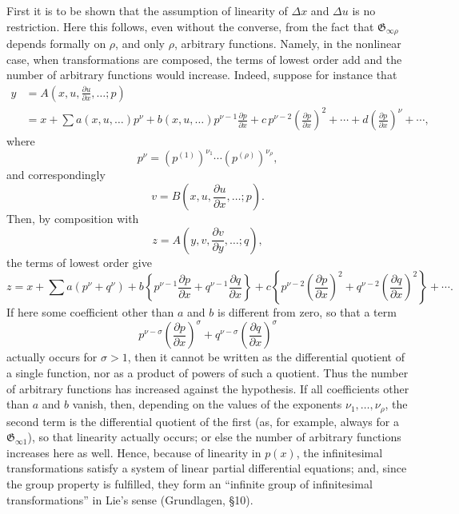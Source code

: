 \documentclass[11pt]{article}
\newcommand{\D}{\Delta}
\providecommand{\G}{\mathfrak G}
\providecommand{\p}{\partial}
\begin{document}
First it is to be shown that the assumption of linearity of \(\D x\) and \(\D u\) is no restriction. Here this follows, even without the converse, from the fact that \(\G_{\infty\rho}\) depends formally on \(\rho\), and only \(\rho\), arbitrary functions. Namely, in the nonlinear case, when transformations are composed, the terms of lowest order add and the number of arbitrary functions would increase. Indeed, suppose for instance that
\[
\begin{aligned}
y&=A\!\left(x,u,\frac{\p u}{\p x},\ldots;p\right)\\
&=x+\sum a(x,u,\ldots)p^\nu
+b(x,u,\ldots)p^{\nu-1}\frac{\p p}{\p x}
+c\,p^{\nu-2}\left(\frac{\p p}{\p x}\right)^2+\cdots
+d\left(\frac{\p p}{\p x}\right)^\nu+\cdots,
\end{aligned}
\]
where
\[
p^\nu=(p^{(1)})^{\nu_1}\cdots(p^{(\rho)})^{\nu_\rho},
\]
and correspondingly
\[
v=B\!\left(x,u,\frac{\p u}{\p x},\ldots;p\right).
\]
Then, by composition with
\[
z=A\!\left(y,v,\frac{\p v}{\p y},\ldots;q\right),
\]
the terms of lowest order give
\[
z=x+\sum a(p^\nu+q^\nu)+
b\left\{p^{\nu-1}\frac{\p p}{\p x}+q^{\nu-1}\frac{\p q}{\p x}\right\}
+c\left\{p^{\nu-2}\left(\frac{\p p}{\p x}\right)^2
+q^{\nu-2}\left(\frac{\p q}{\p x}\right)^2\right\}+\cdots.
\]
If here some coefficient other than \(a\) and \(b\) is different from zero, so that a term
\[
p^{\nu-\sigma}\left(\frac{\p p}{\p x}\right)^\sigma
+q^{\nu-\sigma}\left(\frac{\p q}{\p x}\right)^\sigma
\]
actually occurs for \(\sigma>1\), then it cannot be written as the differential quotient of a single function, nor as a product of powers of such a quotient. Thus the number of arbitrary functions has increased against the hypothesis. If all coefficients other than \(a\) and \(b\) vanish, then, depending on the values of the exponents \(\nu_1,\ldots,\nu_\rho\), the second term is the differential quotient of the first (as, for example, always for a \(\G_{\infty1}\)), so that linearity actually occurs; or else the number of arbitrary functions increases here as well. Hence, because of linearity in \(p(x)\), the infinitesimal transformations satisfy a system of linear partial differential equations; and, since the group property is fulfilled, they form an ``infinite group of infinitesimal transformations'' in Lie's sense (Grundlagen, \S{}10).
\end{document}
